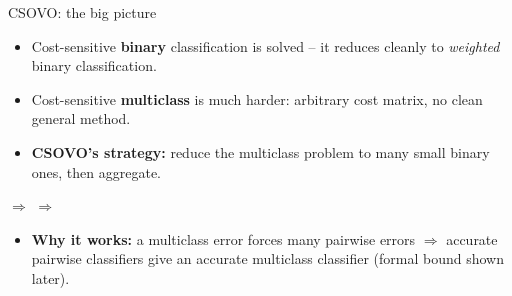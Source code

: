 \documentclass[11pt,compress,t,notes=noshow, xcolor=table]{beamer}
\begin{document}
\begin{frame}{CSOVO: the big picture}
    \begin{itemize}
        \item Cost-sensitive \textbf{binary} classification is solved -- it reduces cleanly to \emph{weighted} binary classification.

        \item Cost-sensitive \textbf{multiclass} is much harder: arbitrary cost matrix, no clean general method.

        \item \textbf{CSOVO's strategy:} reduce the multiclass problem to many small binary ones, then aggregate.
    \end{itemize}

    \vspace{12pt}
    \begin{center}
        \;$\Longrightarrow$\;
        \;$\Longrightarrow$\;
    \end{center}
    \vspace{12pt}

    \begin{itemize}
        \item \textbf{Why it works:} a multiclass error forces many pairwise errors $\Rightarrow$ accurate pairwise classifiers give an accurate multiclass classifier (formal bound shown later).
    \end{itemize}
\end{frame}
\end{document}
